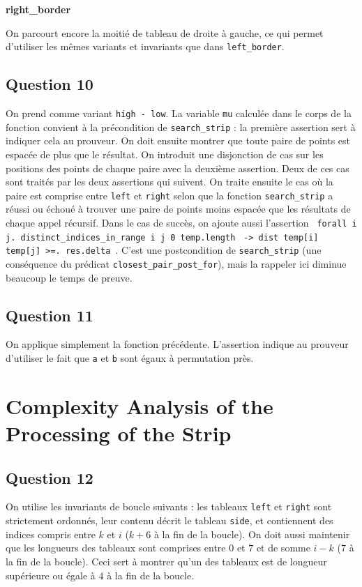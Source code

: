 \documentclass[11pt, openany, a4paper]{article}
\newcommand{\clofor}{\texttt{closest\_pair\_post\_for}}
\begin{document}
\vspace{1em}

\textbf{right\_border}

On parcourt encore la moitié de tableau de droite à gauche, ce qui permet d'utiliser les mêmes variants et invariants que dans \texttt{left\_border}.

\subsection*{Question 10}

On prend comme variant \texttt{high - low}. La variable \texttt{mu} calculée dans le corps de la fonction convient à la précondition de \texttt{search\_strip} : la première assertion sert à indiquer cela au prouveur. On doit ensuite montrer que toute paire de points est espacée de plus que le résultat. On introduit une disjonction de cas sur les positions des points de chaque paire avec la deuxième assertion. Deux de ces cas sont traités par les deux assertions qui suivent. On traite ensuite le cas où la paire est comprise entre \texttt{left} et \texttt{right} selon que la fonction \texttt{search\_strip} a réussi ou échoué à trouver une paire de points moins espacée que les résultats de chaque appel récursif. Dans le cas de succès, on ajoute aussi l'assertion \texttt{ forall i j. distinct\_indices\_in\_range i j 0 temp.length} \texttt{ -> dist temp[i] temp[j] >=. res.delta }. C'est une postcondition de \texttt{search\_strip} (une conséquence du prédicat \clofor), mais la rappeler ici diminue beaucoup le temps de preuve.

\subsection*{Question 11}

On applique simplement la fonction précédente. L'assertion indique au prouveur d'utiliser le fait que \texttt{a} et \texttt{b} sont égaux à permutation près.

\section{Complexity Analysis of the Processing of the Strip}

\subsection*{Question 12}

On utilise les invariants de boucle suivants : les tableaux \texttt{left} et \texttt{right} sont strictement ordonnés, leur contenu décrit le tableau \texttt{side}, et contiennent des indices compris entre $k$ et $i$ ($k+6$ à la fin de la boucle). On doit aussi maintenir que les longueurs des tableaux sont comprises entre $0$ et $7$ et de somme $i-k$ ($7$ à la fin de la boucle). Ceci sert à montrer qu'un des tableaux est de longueur supérieure ou égale à $4$ à la fin de la boucle.
\end{document}
